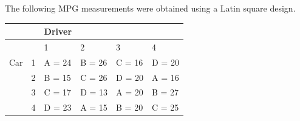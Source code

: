 \documentclass[
]{book}
\newenvironment{Shaded}{\begin{snugshade}}{\end{snugshade}}
\begin{document}
The following MPG measurements were obtained using a Latin square design.

\begin{longtable}[]{@{}llllll@{}}
\toprule()
& & Driver & & & \\
\midrule()
\endhead
& & 1 & 2 & 3 & 4 \\
Car & 1 & A = 24 & B = 26 & C = 16 & D = 20 \\
& 2 & B = 15 & C = 26 & D = 20 & A = 16 \\
& 3 & C = 17 & D = 13 & A = 20 & B = 27 \\
& 4 & D = 23 & A = 15 & B = 20 & C = 25 \\
\bottomrule()
\end{longtable}

\begin{Shaded}
\begin{Highlighting}[]

\end{Highlighting}
\end{Shaded}
\end{document}
